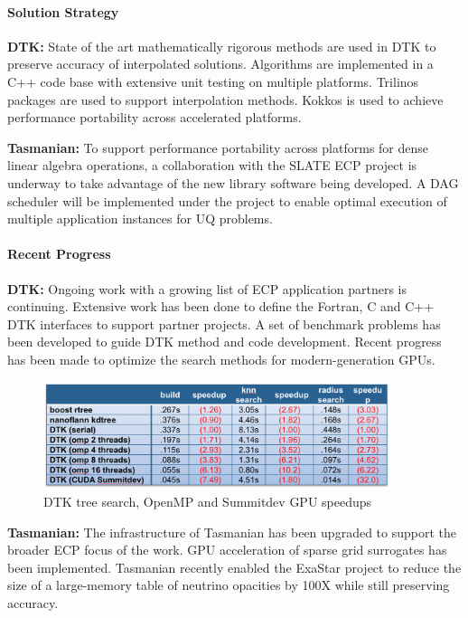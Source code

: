 \paragraph{Solution Strategy}

\nobreak


\indent

{\bf DTK:}
State of the art mathematically rigorous methods are used in
DTK to preserve accuracy of interpolated solutions.
Algorithms are implemented in a C++ code base with extensive
unit testing on multiple platforms.
Trilinos packages are used to support interpolation methods.
Kokkos is used to achieve performance portability
across accelerated platforms.

{\bf Tasmanian:}
To support performance portability across platforms for
dense linear algebra operations, a collaboration with the
SLATE ECP project is underway to take advantage of the new
library software being developed.
A DAG scheduler will be implemented under the project to
enable optimal execution of multiple application instances
for UQ problems.


\paragraph{Recent Progress}

\indent

{\bf DTK:}
Ongoing work with a growing list of ECP application partners
is continuing.
Extensive work has been done to define the Fortran, C and
C++ DTK interfaces to support partner projects.
A set of benchmark problems has been developed
to guide DTK method and code development.
Recent progress has been made to optimize the search methods
for modern-generation GPUs.

\begin{figure}[htb]
        \centering
        \includegraphics[width=4in]{projects/2.3.3-MathLibs/2.3.3.11-ALExa/dtk-gpu}
        \caption{\label{fig:dtk-gpu}DTK tree search, OpenMP and Summitdev GPU speedups}
\end{figure}

{\bf Tasmanian:}
The infrastructure of Tasmanian has been upgraded to support
the broader ECP focus of the work.
GPU acceleration of sparse grid surrogates has been
implemented.
Tasmanian recently enabled the ExaStar project
to reduce the size of a large-memory table of neutrino
opacities by 100X while still preserving accuracy.

